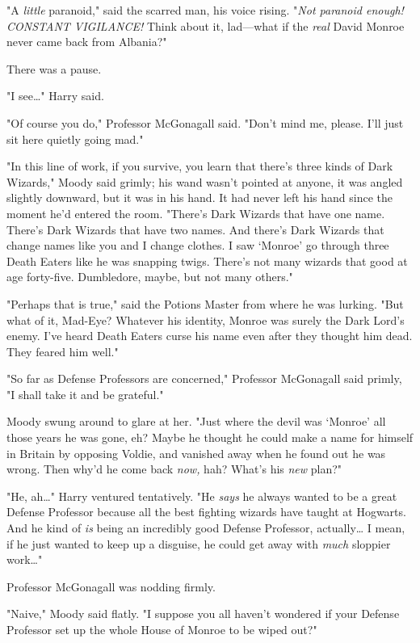 "A \emph{little} paranoid," said the scarred man, his voice rising. "\emph{Not
paranoid enough! CONSTANT VIGILANCE!} Think about it, lad---what if the
\emph{real} David Monroe never came back from Albania?"

There was a pause.

"I see{\ldots}" Harry said.

"Of course you do," Professor McGonagall said. "Don't mind me, please. I'll
just sit here quietly going mad."

"In this line of work, if you survive, you learn that there's three kinds of
Dark Wizards," Moody said grimly; his wand wasn't pointed at anyone, it was
angled slightly downward, but it was in his hand. It had never left his hand
since the moment he'd entered the room. "There's Dark Wizards that have one
name. There's Dark Wizards that have two names. And there's Dark Wizards that
change names like you and I change clothes. I saw `Monroe' go through three
Death Eaters like he was snapping twigs. There's not many wizards that good at
age forty-five. Dumbledore, maybe, but not many others."

"Perhaps that is true," said the Potions Master from where he was lurking. "But
what of it, Mad-Eye? Whatever his identity, Monroe was surely the Dark Lord's
enemy. I've heard Death Eaters curse his name even after they thought him dead.
They feared him well."

"So far as Defense Professors are concerned," Professor McGonagall said primly,
"I shall take it and be grateful."

Moody swung around to glare at her. "Just where the devil was `Monroe' all
those years he was gone, eh? Maybe he thought he could make a name for himself
in Britain by opposing Voldie, and vanished away when he found out he was
wrong. Then why'd he come back \emph{now,} hah? What's his \emph{new} plan?"

"He, ah{\ldots}" Harry ventured tentatively. "He \emph{says} he always wanted
to be a great Defense Professor because all the best fighting wizards have
taught at Hogwarts. And he kind of \emph{is} being an incredibly good Defense
Professor, actually{\ldots} I mean, if he just wanted to keep up a disguise, he
could get away with \emph{much} sloppier work{\ldots}"

Professor McGonagall was nodding firmly.

"Naive," Moody said flatly. "I suppose you all haven't wondered if your Defense
Professor set up the whole House of Monroe to be wiped out?"


